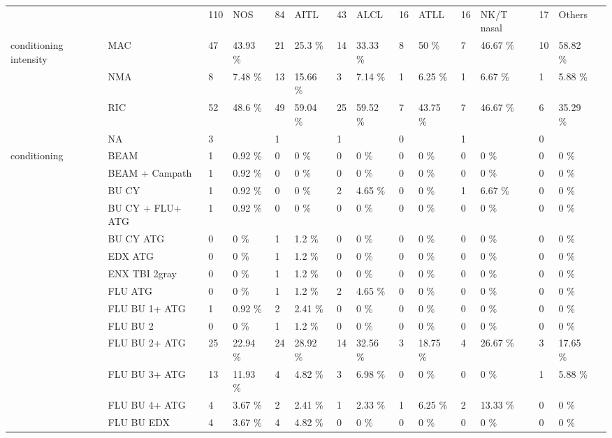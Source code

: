 \documentclass[a4paper,11pt] {article}
\begin{document}
\begin{landscape}
\begin{longtable}{lllllllllllllll}
   &  & 110 & NOS & 84 & AITL & 43 & ALCL & 16 & ATLL & 16 & NK/T nasal & 17 & Others &  \\ 
  conditioning intensity & MAC & 47 & 43.93 \% & 21 & 25.3 \% & 14 & 33.33 \% & 8 & 50 \% & 7 & 46.67 \% & 10 & 58.82 \% &  \\ 
   & NMA & 8 & 7.48 \% & 13 & 15.66 \% & 3 & 7.14 \% & 1 & 6.25 \% & 1 & 6.67 \% & 1 & 5.88 \% &  \\ 
   & RIC & 52 & 48.6 \% & 49 & 59.04 \% & 25 & 59.52 \% & 7 & 43.75 \% & 7 & 46.67 \% & 6 & 35.29 \% &  \\ 
   & NA & 3 &  & 1 &  & 1 &  & 0 &  & 1 &  & 0 &  &  \\ 
  conditioning & BEAM & 1 & 0.92 \% & 0 & 0 \% & 0 & 0 \% & 0 & 0 \% & 0 & 0 \% & 0 & 0 \% &  \\ 
   & BEAM + Campath & 1 & 0.92 \% & 0 & 0 \% & 0 & 0 \% & 0 & 0 \% & 0 & 0 \% & 0 & 0 \% &  \\ 
   & BU CY  & 1 & 0.92 \% & 0 & 0 \% & 2 & 4.65 \% & 0 & 0 \% & 1 & 6.67 \% & 0 & 0 \% &  \\ 
   & BU CY + FLU+ ATG & 1 & 0.92 \% & 0 & 0 \% & 0 & 0 \% & 0 & 0 \% & 0 & 0 \% & 0 & 0 \% &  \\ 
   & BU CY ATG & 0 & 0 \% & 1 & 1.2 \% & 0 & 0 \% & 0 & 0 \% & 0 & 0 \% & 0 & 0 \% &  \\ 
   & EDX ATG & 0 & 0 \% & 1 & 1.2 \% & 0 & 0 \% & 0 & 0 \% & 0 & 0 \% & 0 & 0 \% &  \\ 
   & ENX TBI 2gray & 0 & 0 \% & 1 & 1.2 \% & 0 & 0 \% & 0 & 0 \% & 0 & 0 \% & 0 & 0 \% &  \\ 
   & FLU ATG & 0 & 0 \% & 1 & 1.2 \% & 2 & 4.65 \% & 0 & 0 \% & 0 & 0 \% & 0 & 0 \% &  \\ 
   & FLU BU 1+ ATG & 1 & 0.92 \% & 2 & 2.41 \% & 0 & 0 \% & 0 & 0 \% & 0 & 0 \% & 0 & 0 \% &  \\ 
   & FLU BU 2 & 0 & 0 \% & 1 & 1.2 \% & 0 & 0 \% & 0 & 0 \% & 0 & 0 \% & 0 & 0 \% &  \\ 
   & FLU BU 2+ ATG & 25 & 22.94 \% & 24 & 28.92 \% & 14 & 32.56 \% & 3 & 18.75 \% & 4 & 26.67 \% & 3 & 17.65 \% &  \\ 
   & FLU BU 3+ ATG & 13 & 11.93 \% & 4 & 4.82 \% & 3 & 6.98 \% & 0 & 0 \% & 0 & 0 \% & 1 & 5.88 \% &  \\ 
   & FLU BU 4+ ATG & 4 & 3.67 \% & 2 & 2.41 \% & 1 & 2.33 \% & 1 & 6.25 \% & 2 & 13.33 \% & 0 & 0 \% &  \\ 
   & FLU BU EDX & 4 & 3.67 \% & 4 & 4.82 \% & 0 & 0 \% & 0 & 0 \% & 0 & 0 \% & 0 & 0 \% &  \\ 

\end{longtable}
\end{landscape}
\end{document}
